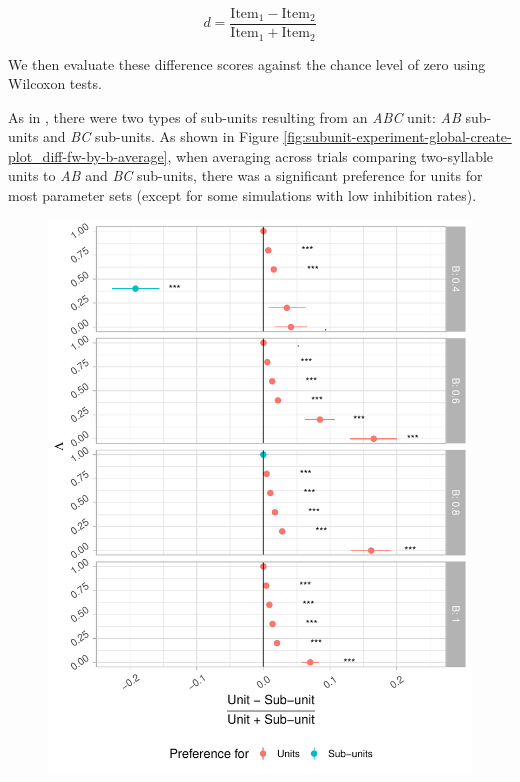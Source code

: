 \documentclass[
]{article}
\begin{document}
\[
d = \frac{\text{Item}_1 - \text{Item}_2}{\text{Item}_1 + \text{Item}_2}
\]

We then evaluate these difference scores against the chance level of
zero using Wilcoxon tests.

As in \citep{Giroux2009}, there were two types of sub-units resulting
from an \emph{ABC} unit: \emph{AB} sub-units and \emph{BC} sub-units. As
shown in Figure
\ref{fig:subunit-experiment-global-create-plot_diff-fw-by-b-average},
when averaging across trials comparing two-syllable units to \emph{AB}
and \emph{BC} sub-units, there was a significant preference for units
for most parameter sets (except for some simulations with low inhibition
rates).

\begin{figure}

{\centering \includegraphics[width=1\linewidth]{tp_model_subunits_files/figure-latex/subunit-experiment-global-create-plot_diff-fw-by-b-average-1} 

}


\end{figure}
\end{document}
